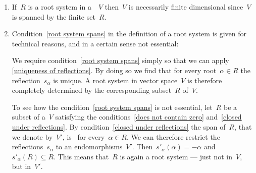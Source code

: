 \begin{remark}
  \leavevmode
  \begin{enumerate}
    \item
      If~$R$ is a root system in a~{\vectorspace{$\kf$}}~$V$ then~$V$ is necessarily finite dimensional since~$V$ is spanned by the finite set~$R$.
    \item
      Condition~\ref*{root system spans} in the definition of a root system is given for technical reasons, and in a certain sense not essential:
      
      We require condition~\ref*{root system spans} simply so that we can apply \cref{uniqueness of reflections}.
      By doing so we find that for every root~$\alpha \in R$ the reflection~$s_\alpha$ is unique.
      A root system in vector space~$V$ is therefore completely determined by the corresponding subset~$R$ of~$V$.
      
      To see how the condition~\ref*{root system spans} is not essential, let~$R$ be a subset of a~$V$ satisfying the conditions~\ref*{does not contain zero} and~\ref*{closed under reflections}.
      By condition~\ref*{closed under reflections} the span of~$R$, that we denote by~$V'$, is~{} for every~$\alpha \in R$.
      We can therefore restrict the reflections~$s_\alpha$ to an endomorphisms~$V'$.
      Then~$s'_\alpha(\alpha) = -\alpha$ and~$s'_\alpha(R) \subseteq R$.
      This means that~$R$ is again a root system --- just not in~$V$, but in~$V'$.
      

\end{enumerate}
\end{remark}
